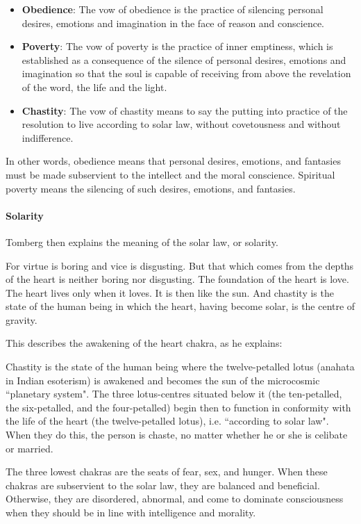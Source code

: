 \begin{itemize}
\item \textbf{Obedience}: The vow of obedience is the practice of silencing personal desires, emotions and imagination in the face of reason and conscience. 
\item \textbf{Poverty}: The vow of poverty is the practice of inner emptiness, which is established as a consequence of the silence of personal desires, emotions and imagination so that the soul is capable of receiving from above the revelation of the word, the life and the light. 
\item \textbf{Chastity}: The vow of chastity means to say the putting into practice of the resolution to live according to solar law, without covetousness and without indifference. 
\end{itemize}
In other words, obedience means that personal desires, emotions, and fantasies must be made subservient to the intellect and the moral conscience. Spiritual poverty means the silencing of such desires, emotions, and fantasies.

\paragraph{Solarity}
Tomberg then explains the meaning of the solar law, or solarity.

\begin{quotex}
For virtue is boring and vice is disgusting. But that which comes from the depths of the heart is neither boring nor disgusting. The foundation of the heart is love. The heart lives only when it loves. It is then like the sun. And chastity is the state of the human being in which the heart, having become solar, is the centre of gravity. 

\end{quotex}
This describes the awakening of the heart chakra, as he explains:

\begin{quotex}
Chastity is the state of the human being where the twelve-petalled lotus (anahata in Indian esoterism) is awakened and becomes the sun of the microcosmic ``planetary system". The three lotus-centres situated below it (the ten-petalled, the six-petalled, and the four-petalled) begin then to function in conformity with the life of the heart (the twelve-petalled lotus), i.e. ``according to solar law". When they do this, the person is chaste, no matter whether he or she is celibate or married. 

\end{quotex}
The three lowest chakras are the seats of fear, sex, and hunger. When these chakras are subservient to the solar law, they are balanced and beneficial. Otherwise, they are disordered, abnormal, and come to dominate consciousness when they should be in line with intelligence and morality.


